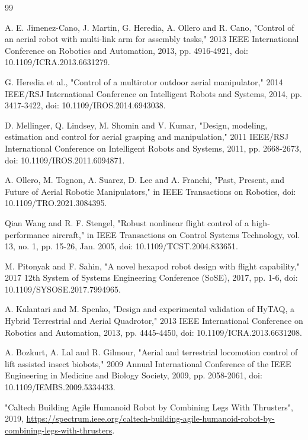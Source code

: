 \begin{thebibliography}{99}

 A. E. Jimenez-Cano, J. Martin, G. Heredia, A. Ollero and R. Cano, "Control of an aerial robot with multi-link arm for assembly tasks," 2013 IEEE International Conference on Robotics and Automation, 2013, pp. 4916-4921, doi: 10.1109/ICRA.2013.6631279.

 G. Heredia et al., "Control of a multirotor outdoor aerial manipulator," 2014 IEEE/RSJ International Conference on Intelligent Robots and Systems, 2014, pp. 3417-3422, doi: 10.1109/IROS.2014.6943038.

 D. Mellinger, Q. Lindsey, M. Shomin and V. Kumar, "Design, modeling, estimation and control for aerial grasping and manipulation," 2011 IEEE/RSJ International Conference on Intelligent Robots and Systems, 2011, pp. 2668-2673, doi: 10.1109/IROS.2011.6094871.

 A. Ollero, M. Tognon, A. Suarez, D. Lee and A. Franchi, "Past, Present, and Future of Aerial Robotic Manipulators," in IEEE Transactions on Robotics, doi: 10.1109/TRO.2021.3084395.

 Qian Wang and R. F. Stengel, "Robust nonlinear flight control of a high-performance aircraft," in IEEE Transactions on Control Systems Technology, vol. 13, no. 1, pp. 15-26, Jan. 2005, doi: 10.1109/TCST.2004.833651.

M. Pitonyak and F. Sahin, "A novel hexapod robot design with flight capability," 2017 12th System of Systems Engineering Conference (SoSE), 2017, pp. 1-6, doi: 10.1109/SYSOSE.2017.7994965.

 A. Kalantari and M. Spenko, "Design and experimental validation of HyTAQ, a Hybrid Terrestrial and Aerial Quadrotor," 2013 IEEE International Conference on Robotics and Automation, 2013, pp. 4445-4450, doi: 10.1109/ICRA.2013.6631208.

 A. Bozkurt, A. Lal and R. Gilmour, "Aerial and terrestrial locomotion control of lift assisted insect biobots," 2009 Annual International Conference of the IEEE Engineering in Medicine and Biology Society, 2009, pp. 2058-2061, doi: 10.1109/IEMBS.2009.5334433.

 "Caltech Building Agile Humanoid Robot by Combining Legs With Thrusters", 2019, \url{https://spectrum.ieee.org/caltech-building-agile-humanoid-robot-by-combining-legs-with-thrusters}.


\end{thebibliography}
